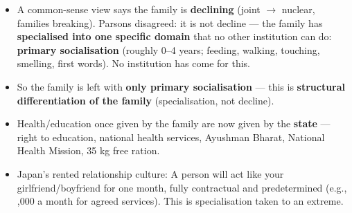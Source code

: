 \begin{CriticalPoint}
\begin{itemize}
\item A common-sense view says the family is \textbf{declining} (joint $\rightarrow$ nuclear, families breaking). Parsons disagreed: it is not decline --- the family has \textbf{specialised into one specific domain} that no other institution can do: \textbf{primary socialisation} (roughly 0--4 years; feeding, walking, touching, smelling, first words). No institution has come for this.
\item So the family is left with \textbf{only primary socialisation} --- this is \textbf{structural differentiation of the family} (specialisation, not decline).
\item Health/education once given by the family are now given by the \textbf{state} --- right to education, national health services, Ayushman Bharat, National Health Mission, 35 kg free ration.
\end{itemize}
\end{CriticalPoint}

\begin{ExampleBox}
\begin{itemize}
\item Japan's rented relationship culture: A person will act like your girlfriend/boyfriend for one month, fully contractual and predetermined (e.g., ,000 a month for agreed services). This is specialisation taken to an extreme.
\end{itemize}
\end{ExampleBox}

